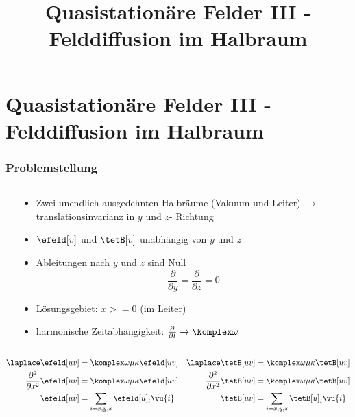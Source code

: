 
  
\title[TET: Quasistationäre Felder III- Felddiffusion im Halbraum]{Quasistationäre Felder III - Felddiffusion im Halbraum}


% 
% 

\maketitle

% 
% 
\section{Quasistationäre Felder III - Felddiffusion im Halbraum}

\begin{frame}
  \frametitle{Problemstellung}
  \begin{columns}
    \begin{column}{.4\linewidth}
      \centerline{\resizebox{\columnwidth}{!}{}}
      \end{column}
   \begin{column}{.6\linewidth}
  \begin{itemize}[<+->]
  \item Zwei unendlich ausgedehnten Halbräume (Vakuum und Leiter) $\to$ translationsinvarianz in $y$ und $z$- Richtung
  \item \(\efeld[v] \) und \(\tetB[v] \) unabhängig von \(y\) und \(z\)
\item Ableitungen nach \(y\) und \(z\) sind Null
  $$
  \dfrac{\partial}{\partial y} = \dfrac{\partial}{\partial z} = 0
  $$
  \item Lösungsgebiet: $x>=0$ (im Leiter)
  \item harmonische Zeitabhängigkeit: $\frac{\partial}{\partial t} \to \komplex\omega$
  \end{itemize}
\end{column}
\end{columns}\pause

\begin{align*}
\laplace \efeld[uv] &= \komplex\omega\mu\kappa \efeld[uv]    & \laplace \tetB[uv] &= \komplex \omega\mu \kappa \tetB[uv]\\ 
\dfrac{\partial^2}{\partial x^2} \efeld[uv] &= \komplex\omega\mu \kappa \efeld[uv] & \dfrac{\partial^2}{\partial x^2} \tetB[uv] &= \komplex \omega \mu \kappa \tetB[uv]\\
\efeld[uv] & = \sum_{i=x,y,z}\efeld[u]_i \vu{i} & \tetB[uv] &= \sum_{i=x,y,z}\tetB[u]_i \vu{i}
\end{align*}
\end{frame}

